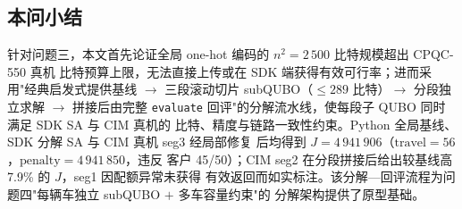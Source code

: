 \documentclass[UTF8,12pt,a4paper]{ctexart}
\begin{document}
\subsection{本问小结}

针对问题三，本文首先论证全局 one-hot 编码的 $n^{2}=2\,500$ 比特规模超出 CPQC-550 真机
比特预算上限，无法直接上传或在 SDK 端获得有效可行率；进而采用"经典启发式提供基线
$\to$ 三段滚动切片 subQUBO（$\le 289$ 比特）$\to$ 分段独立求解 $\to$ 拼接后由完整
\texttt{evaluate} 回评"的分解流水线，使每段子 QUBO 同时满足 SDK SA 与 CIM 真机的
比特、精度与链路一致性约束。Python 全局基线、SDK 分解 SA 与 CIM 真机 seg3 经局部修复
后均得到 $J=4\,941\,906$（$\mathrm{travel}=56$，$\mathrm{penalty}=4\,941\,850$，违反
客户 45/50）；CIM seg2 在分段拼接后给出较基线高 7.9\% 的 $J$，seg1 因配额异常未获得
有效返回而如实标注。该分解—回评流程为问题四"每辆车独立 subQUBO $+$ 多车容量约束"的
分解架构提供了原型基础。
\end{document}
